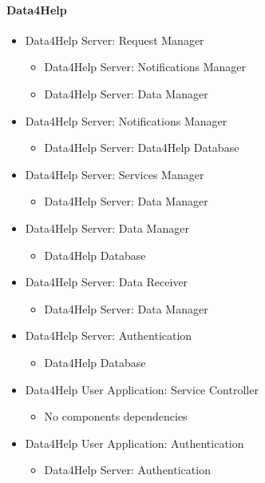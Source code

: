 \documentclass[../DD.tex]{subfiles}
\begin{document}
\paragraph{Data4Help}
\begin{itemize}

	\item{Data4Help Server: Request Manager}
	\begin{itemize}\item{Data4Help Server: Notifications Manager}\item{Data4Help Server: Data Manager}\end{itemize}

	\item{Data4Help Server: Notifications Manager}
	\begin{itemize}\item{Data4Help Server: Data4Help Database}\end{itemize}

	\item{Data4Help Server: Services Manager}
	\begin{itemize}\item{Data4Help Server: Data Manager}\end{itemize}

	\item{Data4Help Server: Data Manager}
	\begin{itemize}\item{Data4Help Database}\end{itemize}

	\item{Data4Help Server: Data Receiver}
	\begin{itemize}\item{Data4Help Server: Data Manager}\end{itemize}

	\item{Data4Help Server: Authentication}
	\begin{itemize}\item{Data4Help Database}\end{itemize}

	\item{Data4Help User Application: Service Controller}
	\begin{itemize}\item{No components dependencies}\end{itemize}

	\item{Data4Help User Application: Authentication}
	\begin{itemize}\item{Data4Help Server: Authentication}\end{itemize}


\end{itemize}
\end{document}
